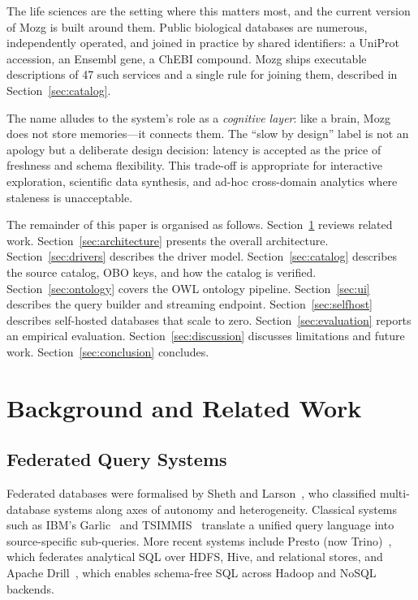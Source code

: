 \documentclass[sigconf,nonacm]{acmart}
\begin{document}
The life sciences are the setting where this matters most, and the
current version of Mozg is built around them.  Public biological
databases are numerous, independently operated, and joined in practice
by shared identifiers: a UniProt accession, an Ensembl gene, a ChEBI
compound.  Mozg ships executable descriptions of 47 such services and a
single rule for joining them, described in Section~\ref{sec:catalog}.

The name alludes to the system's role as a \emph{cognitive layer}: like
a brain, Mozg does not store memories---it connects them.  The
``slow by design'' label is not an apology but a deliberate design
decision: latency is accepted as the price of freshness and schema
flexibility.  This trade-off is appropriate for interactive exploration,
scientific data synthesis, and ad-hoc cross-domain analytics where
staleness is unacceptable.

The remainder of this paper is organised as follows.
Section~\ref{sec:background} reviews related work.
Section~\ref{sec:architecture} presents the overall architecture.
Section~\ref{sec:drivers} describes the driver model.
Section~\ref{sec:catalog} describes the source catalog, OBO keys, and
how the catalog is verified.
Section~\ref{sec:ontology} covers the OWL ontology pipeline.
Section~\ref{sec:ui} describes the query builder and streaming endpoint.
Section~\ref{sec:selfhost} describes self-hosted databases that scale
to zero.
Section~\ref{sec:evaluation} reports an empirical evaluation.
Section~\ref{sec:discussion} discusses limitations and future work.
Section~\ref{sec:conclusion} concludes.

\section{Background and Related Work}
\label{sec:background}

\subsection{Federated Query Systems}

Federated databases were formalised by Sheth and Larson~\cite{sheth1990federated},
who classified multi-database systems along axes of autonomy and
heterogeneity.  Classical systems such as IBM's Garlic~\cite{haas1997optimizing}
and TSIMMIS~\cite{hammer1995tsimmis} translate a unified query language
into source-specific sub-queries.  More recent systems include Presto
(now Trino)~\cite{sethi2019presto}, which federates analytical SQL over
HDFS, Hive, and relational stores, and Apache Drill~\cite{hausenblas2013apache},
which enables schema-free SQL across Hadoop and NoSQL backends.
\end{document}
